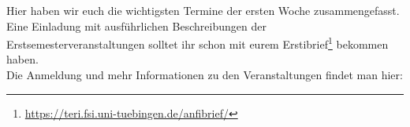 
Hier haben wir euch die wichtigsten Termine der ersten Woche
zusammengefasst. Eine Einladung mit ausführlichen Beschreibungen der
Erstsemesterveranstaltungen solltet ihr schon mit eurem
Erstibrief\footnote{\url{https://teri.fsi.uni-tuebingen.de/anfibrief/}}
bekommen haben.\\
Die Anmeldung und mehr Informationen zu den Veranstaltungen findet man hier:\\

\newcommand{\event}{\cellcolor{lightlightgray}}



